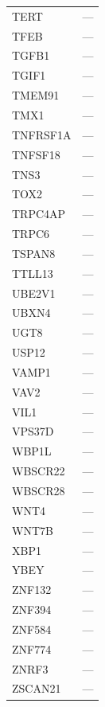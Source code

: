\begin{longtable}{ll}
  TERT & --- \\
  TFEB & --- \\
  TGFB1 & --- \\
  TGIF1 & --- \\
  TMEM91 & --- \\
  TMX1 & --- \\
  TNFRSF1A & --- \\
  TNFSF18 & --- \\
  TNS3 & --- \\
  TOX2 & --- \\
  TRPC4AP & --- \\
  TRPC6 & --- \\
  TSPAN8 & --- \\
  TTLL13 & --- \\
  UBE2V1 & --- \\
  UBXN4 & --- \\
  UGT8 & --- \\
  USP12 & --- \\
  VAMP1 & --- \\
  VAV2 & --- \\
  VIL1 & --- \\
  VPS37D & --- \\
  WBP1L & --- \\
  WBSCR22 & --- \\
  WBSCR28 & --- \\
  WNT4 & --- \\
  WNT7B & --- \\
  XBP1 & --- \\
  YBEY & --- \\
  ZNF132 & --- \\
  ZNF394 & --- \\
  ZNF584 & --- \\
  ZNF774 & --- \\
  ZNRF3 & --- \\
  ZSCAN21 & --- \\
\bottomrule
\end{longtable}
